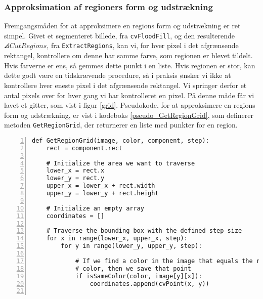 {\subsubsection{Approksimation af regioners form og udstrækning}
Fremgangsmåden for at approksimere en regions form og udstrækning er ret
simpel. Givet et segmenteret billede, fra \texttt{cvFloodFill}, og den
resulterende $\angles{CutRegions}$, fra \texttt{ExtractRegions}, kan vi,
for hver pixel i det afgrænsende rektangel, kontrollere om denne har
samme farve, som regionen er blevet tildelt. Hvis farverne er ens, så
gemmes dette punkt i en liste. Hvis regionen er stor, kan dette godt
være en tidskrævende procedure, så i praksis ønsker vi ikke at
kontrollere hver eneste pixel i det afgrænsende rektangel. Vi springer
derfor et antal pixels over for hver gang vi har kontrolleret en pixel.
På denne måde får vi lavet et gitter, som vist i figur
\ref{grid}. Pseudokode, for at approksimere en regions form og
udstrækning, er vist i kodeboks \ref{pseudo_GetRegionGrid}, som definerer
metoden \texttt{GetRegionGrid}, der returnerer en liste med punkter for
en region.

\begin{lstlisting}[caption={Metode til at approksimere en regions
    form. Bemærk linje 19, hvor der ses et eksempel på det omvendte
    koordinatsystem i \emph{OpenCV}.}, captionpos=b,
    label={pseudo_GetRegionGrid}, frame=tb,
    breaklines=false, float=bh, numbers=left]
def GetRegionGrid(image, color, component, step):
    rect = component.rect

    # Initialize the area we want to traverse
    lower_x = rect.x
    lower_y = rect.y
    upper_x = lower_x + rect.width
    upper_y = lower_y + rect.height

    # Initialize an empty array
    coordinates = []

    # Traverse the bounding box with the defined step size
    for x in range(lower_x, upper_x, step):
        for y in range(lower_y, upper_y, step):

            # If we find a color in the image that equals the region
            # color, then we save that point
            if isSameColor(color, image[y][x]):
                coordinates.append(cvPoint(x, y))


\end{lstlisting}}

